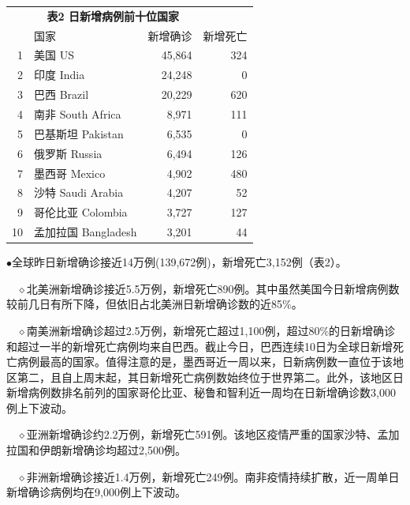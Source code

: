 \documentclass[]{article}
\begin{document}
\begin{table}[H]
   \centering \begin{table}[H]
\centering\begingroup\fontsize{18}{20}\selectfont

\begin{tabular}{rlrr}
\toprule
\multicolumn{0}{c}{\textbf{ }} & \multicolumn{2}{c}{\textbf{表2 日新增病例前十位国家}} \\
  & 国家 & 新增确诊 & 新增死亡\\
\midrule
\rowcolor{gray!6}  1 & 美国 US & 45,864 & 324\\
2 & 印度 India & 24,248 & 0\\
\rowcolor{gray!6}  3 & 巴西 Brazil & 20,229 & 620\\
4 & 南非 South Africa & 8,971 & 111\\
\rowcolor{gray!6}  5 & 巴基斯坦 Pakistan & 6,535 & 0\\
6 & 俄罗斯 Russia & 6,494 & 126\\
\rowcolor{gray!6}  7 & 墨西哥 Mexico & 4,902 & 480\\
8 & 沙特 Saudi Arabia & 4,207 & 52\\
\rowcolor{gray!6}  9 & 哥伦比亚 Colombia & 3,727 & 127\\
10 & 孟加拉国 Bangladesh & 3,201 & 44\\
\bottomrule
\end{tabular}
\endgroup{}
\end{table} \end{table}

\(\bullet\)全球昨日新增确诊接近14万例(139,672例)，新增死亡3,152例（表2）。

\(\quad\)\(\diamond\)北美洲新增确诊接近5.5万例，新增死亡890例。其中虽然美国今日新增病例数较前几日有所下降，但依旧占北美洲日新增确诊数的近85\%。

\(\quad\)\(\diamond\)南美洲新增确诊超过2.5万例，新增死亡超过1,100例，超过80\%的日新增确诊和超过一半的新增死亡病例均来自巴西。截止今日，巴西连续10日为全球日新增死亡病例最高的国家。值得注意的是，墨西哥近一周以来，日新病例数一直位于该地区第二，且自上周末起，其日新增死亡病例数始终位于世界第二。此外，该地区日新增病例数排名前列的国家哥伦比亚、秘鲁和智利近一周均在日新增确诊数3,000例上下波动。

\(\quad\)\(\diamond\)亚洲新增确诊约2.2万例，新增死亡591例。该地区疫情严重的国家沙特、孟加拉国和伊朗新增确诊均超过2,500例。

\(\quad\)\(\diamond\)非洲新增确诊接近1.4万例，新增死亡249例。南非疫情持续扩散，近一周单日新增确诊病例均在9,000例上下波动。
\end{document}
